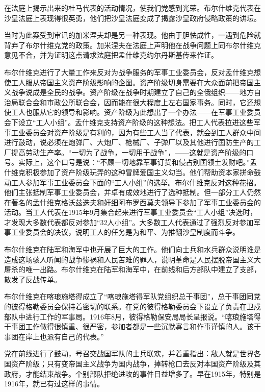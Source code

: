 在法庭上揭示出来的杜马代表的活动情况，使我们党感到光荣。布尔什维克代表在沙皇法庭上表现得很英勇，他们把沙皇法庭变成了揭露沙皇政府侵略政策的讲坛。

当时为此案受到审讯的加米涅夫却是另一种表现。他由于胆怯成性，一遇到危险就背弃了布尔什维克党的政策。加米涅夫在法庭上声明他在战争问题上同布尔什维克意见不合，并为证明这点请求法庭把孟什维克约尔丹斯基传来作证。

布尔什维克进行了大量工作来反对为战争服务的军事工业委员会，反对孟什维克想使工人服从帝国主义资产阶级影响的企图。资产阶级切身需要在大众面前把帝国主义战争说成是全民的战争。资产阶级在战争时期建立了自己的全俄组织——地方自治局联合会和市政公所联合会，因而能在很大程度上左右国家事务。同时，它还想使工人也服从它的领导和影响。资产阶级为此想出了一个办法——在军事工业委员会下设立“工人小组”。孟什维克支持资产阶级的这种想法。把工人代表拉进这些军事工业委员会对资产阶级是有利的，因为有些工人当了代表，就会到工人群众中间进行鼓动，说必须在炮弹厂、大炮厂、枪械厂、子弹厂以及其他进行国防生产的工厂提高劳动生产率。“一切为了战争，一切用于战争”，——这就是资产阶级的口号。实际上，这个口号是说：“不顾一切地靠军事订货和侵占别国领土发财吧。”孟什维克积极参加了资产阶级玩弄的这种冒牌爱国主义勾当。他们帮助资本家拼命鼓动工人参加军事工业委员会下面的“工人小组”的选举。布尔什维克反对这种花招。他们主张抵制军事工业委员会，并卓有成效地进行了选种抵制。但一部分工人仍然在著名的孟什维克格沃兹迭夫和奸细阿布罗西莫夫领导下参加了军事工业委员会的活动。当工人代表在1915年9月集合起来进行军事工业委员会“工人小组”决选时，才发现大多数代表都反对参加“32人小组”。大多数工人代表通过了强烈反对参加军事工业委员会的决议，说明工人的任务是为和平、为推翻沙皇制度而斗争。

布尔什维克在陆军和海军中也开展了巨大的工作。他们向士兵和水兵群众说明谁是造成这场骇人听闻的战争惨祸和人民苦难的罪人，说明革命是人民摆脱帝国主义大屠杀的唯一出路。布尔什维克在陆军和海军中，在前线和后方部队中建立了支部，散发了反战传单。

布尔什维克在喀琅施塔得成立了“喀琅施塔得军队党组织总干事团”，总干事团同党的彼得格勒委员会保持着密切的联系。在党的彼得格勒委员会下设立了负责在卫戍部队中进行工作的军事局。1916年8月，彼得格勒保安局局长呈报说。“喀琅施塔得干事团工作做得很慎重、很严密，参加者都是一些沉默寡言和作事谨慎的人。该干事团在岸上也派有自己的代表。”

党在前线进行了鼓动，号召交战国军队的士兵联欢，并着重指出：敌人就是世界各国资产阶级；只有变帝国主义战争为国内战争，掉转枪口去反对本国资产阶级及其政府，才能结束战争。个别部队拒绝进攻的事件日益增多了。早在1915年，特别是1916年，就已有过这样的事情。

